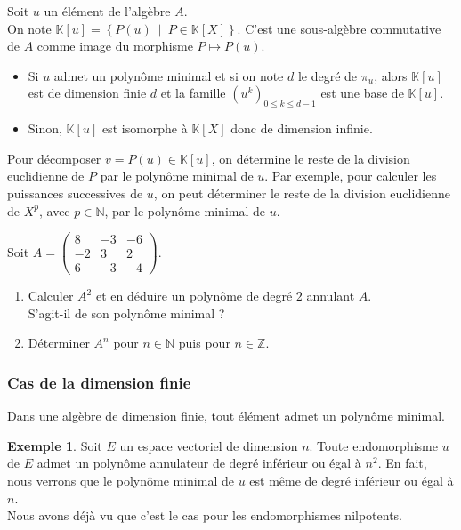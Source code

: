\documentclass[french]{article}
\newcommand{\N}{\mathbb{N}}
\newcommand{\Z}{\mathbb{Z}}
\newcommand{\K}{\mathbb{K}}
\theoremstyle{plain}
\theoremstyle{definition}
\newtheorem*{ex}{Exemple}
\theoremstyle{remark}
\begin{document}
Soit $u$ un élément de l'algèbre $A$. \\
On note $\K[u]=\left\{P(u)\ \mid\ P\in\K[X]\right\}$. C'est une sous-algèbre commutative de $A$ comme image du morphisme $P\mapsto P(u)$.

\begin{prop}%
	\begin{itemize}
		\item Si $u$ admet un polynôme minimal et si on note $d$ le degré de $\pi_u$, alors $\K[u]$ est de dimension finie $d$ et la famille $(u^k)_{0\leqslant k\leqslant d-1}$ est une base de $\K[u]$.
		\item Sinon, $\K[u]$ est isomorphe à $\K[X]$ donc de dimension infinie.
	\end{itemize}
\end{prop}

\begin{met}
	Pour décomposer $v=P(u)\in\K[u]$, on détermine le reste de la division euclidienne de $P$ par le polynôme minimal de $u$. Par exemple, pour calculer les puissances successives de $u$, on peut déterminer le reste de la division euclidienne de $X^p$, avec $p\in\N$, par le polynôme minimal de $u$.
\end{met}

\begin{exo}
	Soit $A=\displaystyle\begin{pmatrix}
		8&-3&-6\\
		-2&3&2\\
		6&-3&-4
	\end{pmatrix}$.
	\begin{enumerate}
		\item Calculer $A^2$ et en déduire un polynôme de degré $2$ annulant $A$. \\ S'agit-il de son polynôme minimal ?
		\item Déterminer $A^n$ pour $n\in\N$ puis pour $n\in\Z$.
	\end{enumerate}
\end{exo}

\subsubsection*{Cas de la dimension finie}

\begin{prop}%
	Dans une algèbre de dimension finie, tout élément admet un polynôme minimal.
\end{prop}

\begin{ex}
	Soit $E$ un espace vectoriel de dimension $n$. Toute endomorphisme $u$ de $E$ admet un polynôme annulateur de degré inférieur ou égal à $n^2$. En fait, nous verrons que le polynôme minimal de $u$ est même de degré inférieur ou égal à $n$. \\ Nous avons déjà vu que c'est le cas pour les endomorphismes nilpotents.
\end{ex}
\end{document}
